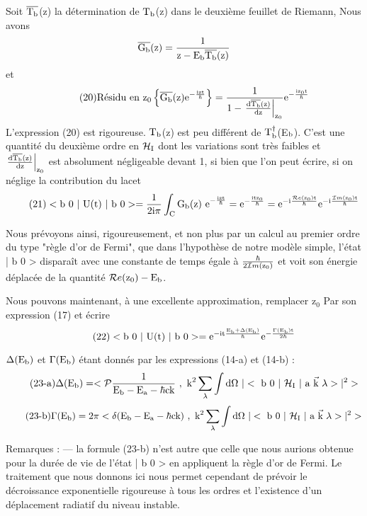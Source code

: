 Soit $\overline{\text{T}_{\text{b}}}$(z) la détermination de $\text{T}_{\text{b}}$(z) dans le deuxième feuillet
de Riemann, Nous avons
\[
\overline{\text{G}_{\text{b}}}\text{(z)}=\frac{1}{\text{z}-\text{E}_{\text{b}}\overline{\text{T}_{\text{b}}}\text{(z)}}
\]
et
\[
\tag{20}\text{Résidu en z}_0 \left \{ \overline{\text{G}_{\text{b}}}\text{(z)}\text{e}^{-\frac{\text{izt}}{\hbar}} \right \} =
\frac{1}{1-\left .\frac{\text{d}\overline{\text{T}_{\text{b}}}\text{(z)}}{\text{dz}}\right |_{\text{z}_0}}
\text{e}^{-\frac{\text{iz}_0\text{t}}{\hbar}}
\]
L'expression (20) est rigoureuse. $\text{T}_{\text{b}}$(z) est peu différent de $\text{T}_{\text{b}}^\dagger$(E$_{\text{b}}$).
C'est une quantité du deuxième ordre en $\mathcal{H}_{\text{I}}$ dont les variations sont très
faibles et $\left .\frac{\text{d}\overline{\text{T}_{\text{b}}}\text{(z)}}{\text{dz}}\right |_{\text{z}_0}$ est absolument négligeable devant 1, si bien que
l'on peut écrire, si on néglige la contribution du lacet
\[
\tag{21}<\text{b 0 }|\text{ U(t) }|\text{ b 0}> =
\frac{1}{2\text{i}\pi}\int_{\text{C}}\text{G}_{\text{b}}\text{(z) e}^{-\frac{\text{izt}}{\hbar}}
= \text{e}^{-\frac{\text{itz}_0}{\hbar}}
= \text{e}^{-\text{i}\frac{\mathcal{R}e(\text{z}_0)\text{t}}{\hbar}} \text{e}^{-\text{i}\frac{\mathcal{I}m(\text{z}_0)\text{t}}{\hbar}}
\]

Nous prévoyons ainsi, rigoureusement, et non plus par un calcul
au premier ordre du type "règle d'or de Fermi", que dans l'hypothèse de notre
modèle simple, l'état | b 0 > disparaît avec une constante de temps égale à
$\frac{\hbar}{2\mathcal{I}m(\text{z}_0)}$
 et voit son énergie déplacée de la quantité $\mathcal{R}e(\text{z}_0)-\text{E}_{\text{b}}$.
 
Nous pouvons maintenant, à une excellente approximation, remplacer
z$_0$ Par son expression (17) et écrire
\[
\tag{22}<\text{b 0 }|\text{ U(t) }|\text{ b 0}> =
\text{e}^{-\text{it}\frac{\text{E}_{\text{b}}+\Delta(\text{E}_{\text{b}})}{\hbar}}
\text{e}^{-\frac{\Gamma(\text{E}_{\text{b}})\text{t}}{2\hbar}}
\]

$\Delta(\text{E}_{\text{b}})$ et $\Gamma(\text{E}_{\text{b}})$ étant donnés par les expressions (14-a) et (14-b) :
\[
\tag{23-a}\Delta(\mt{E}_\mt{b})=<\mc{P}\frac{1}
{\mt{E}_\mt{b}-\mt{E}_\mt{a}-\hbar\mt{ck}}\ ,
\mt{ k}^2\sum_\lambda\int\mt{d}\Omega\ |<\mt{ b 0 }|\ \mc{H}_\mt{I}\ |\mt{ a }\vec{\mt{k}}\ \lambda >|^2>
\]
\[
\tag{23-b}\Gamma(\mt{E}_\mt{b})=2\pi<\delta
(\mt{E}_\mt{b}-\mt{E}_\mt{a}-\hbar\mt{ck})\ ,
\mt{ k}^2\sum_\lambda\int\mt{d}\Omega\ |<\mt{ b 0 }|\ \mc{H}_\mt{I}\ |\mt{ a }\vec{\mt{k}}\ \lambda >|^2>
\]

Remarques : — la formule (23-b) n'est autre que celle que nous aurions
obtenue pour la durée de vie de l'état | b 0 > en appliquent la règle d'or
de Fermi. Le traitement que nous donnons ici nous permet cependant de prévoir le décroissance exponentielle rigoureuse à tous les ordres et l'existence d'un déplacement radiatif du niveau instable.

